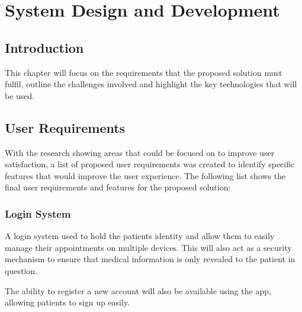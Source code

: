
\chapter{System Design and Development} %

\label{Chapter4} %



\section{Introduction}

This chapter will focus on the requirements that the proposed solution must fulfil, outline the challenges involved and highlight the key technologies that will be used.



\section{User Requirements}

With the research showing areas that could be focused on to improve user satisfaction, a list of proposed user requirements was  created to identify specific features that would improve the user experience. The following list shows the final user requirements and features for the proposed solution:

\subsection{Login System}

A login system used to hold the patients identity and allow them to easily manage their appointments on multiple devices. This will also act as a security mechanism to ensure that medical information is only revealed to the patient in question.

The ability to register a new account will also be available using the app, allowing patients to sign up easily.

